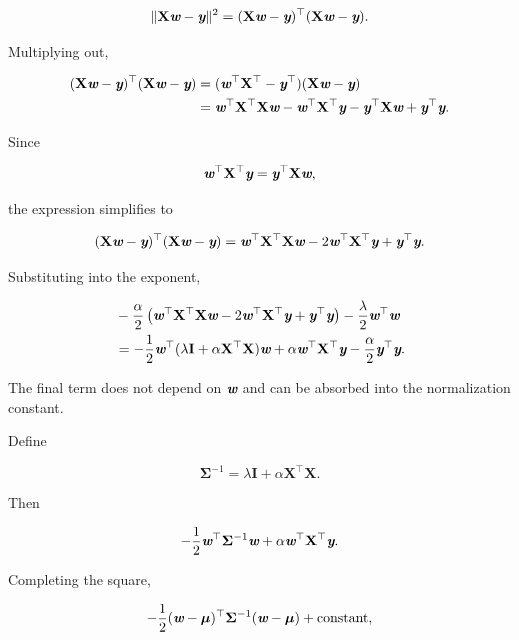 \documentclass[14pt]{extarticle}
\def\mathbi#1{\textbf{\em #1}}
\begin{document}
\[
\|\mathbf{X}\mathbi{w}-\mathbi{y}\|^2
=
(\mathbf{X}\mathbi{w}-\mathbi{y})^\top
(\mathbf{X}\mathbi{w}-\mathbi{y}).
\]

Multiplying out,

\begin{align*}
(\mathbf{X}\mathbi{w}-\mathbi{y})^\top
(\mathbf{X}\mathbi{w}-\mathbi{y})
&=
(\mathbi{w}^\top\mathbf{X}^\top-\mathbi{y}^\top)
(\mathbf{X}\mathbi{w}-\mathbi{y})\\
&=
\mathbi{w}^\top\mathbf{X}^\top\mathbf{X}\mathbi{w}
-\mathbi{w}^\top\mathbf{X}^\top\mathbi{y}
-\mathbi{y}^\top\mathbf{X}\mathbi{w}
+\mathbi{y}^\top\mathbi{y}.
\end{align*}

Since

\[
\mathbi{w}^\top\mathbf{X}^\top\mathbi{y}
=
\mathbi{y}^\top\mathbf{X}\mathbi{w},
\]

the expression simplifies to

\[
(\mathbf{X}\mathbi{w}-\mathbi{y})^\top
(\mathbf{X}\mathbi{w}-\mathbi{y})
=
\mathbi{w}^\top\mathbf{X}^\top\mathbf{X}\mathbi{w}
-
2\mathbi{w}^\top\mathbf{X}^\top\mathbi{y}
+
\mathbi{y}^\top\mathbi{y}.
\]

Substituting into the exponent,

\begin{align*}
&
-\frac{\alpha}{2}
\left(
\mathbi{w}^\top\mathbf{X}^\top\mathbf{X}\mathbi{w}
-
2\mathbi{w}^\top\mathbf{X}^\top\mathbi{y}
+
\mathbi{y}^\top\mathbi{y}
\right)
-
\frac{\lambda}{2}
\mathbi{w}^\top\mathbi{w}\\
&=
-\frac12
\mathbi{w}^\top
(
\lambda\mathbf{I}
+
\alpha\mathbf{X}^\top\mathbf{X}
)
\mathbi{w}
+
\alpha
\mathbi{w}^\top
\mathbf{X}^\top
\mathbi{y}
-
\frac{\alpha}{2}
\mathbi{y}^\top\mathbi{y}.
\end{align*}

The final term does not depend on $\mathbi{w}$ and can be absorbed into the normalization constant.

Define

\[
\mathbf{\Sigma}^{-1}
=
\lambda\mathbf{I}
+
\alpha\mathbf{X}^\top\mathbf{X}.
\]

Then

\[
-\frac12
\mathbi{w}^\top
\mathbf{\Sigma}^{-1}
\mathbi{w}
+
\alpha
\mathbi{w}^\top
\mathbf{X}^\top
\mathbi{y}.
\]

Completing the square,

\[
-\frac12
(\mathbi{w}-\boldsymbol{\mu})^\top
\mathbf{\Sigma}^{-1}
(\mathbi{w}-\boldsymbol{\mu})
+
\text{constant},
\]
\end{document}
